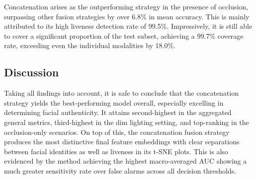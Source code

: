 \documentclass{mpaper}
\begin{document}
\begin{table}[h!]
    \centering
    \vspace{-0.4cm}
    \vspace{0.1cm}
    \caption{Averaged accuracy and $F_{0.5}$ score for the seven fusion strategies and individual modalities, isolated on the \textbf{occlusion} scenarios. Equal weighting is applied to subject and liveness predictions.}
    \label{tab:occlusion_averaged_acc_fb}
    \vspace{-0.5cm}
\end{table}

Concatenation arises as the outperforming strategy in the presence of occlusion, surpassing other fusion strategies by over 6.8\% in mean accuracy. This is mainly attributed to its high liveness detection rate of 99.5\%. Impressively, it is still able to cover a significant proportion of the test subset, achieving a 99.7\% coverage rate, exceeding even the individual modalities by 18.0\%. 


\subsection{Discussion}
Taking all findings into account, it is safe to conclude that the concatenation strategy yields the best-performing model overall, especially excelling in determining facial authenticity. It attains second-highest in the aggregated general metrics, third-highest in the dim lighting setting, and top-ranking in the occlusion-only scenarios. On top of this, the concatenation fusion strategy produces the most distinctive final feature embeddings with clear separations between facial identities as well as liveness in its t-SNE plots. This is also evidenced by the method achieving the highest macro-averaged AUC showing a much greater sensitivity rate over false alarms across all decision thresholds. 
\end{document}
